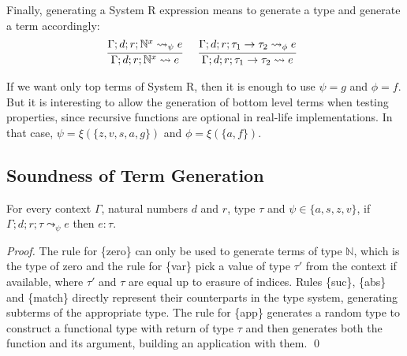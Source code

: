 \documentclass[runningheads]{llncs}
\newcommand{\tN}{\mathbb{N}}
\begin{document}
\noindent Finally, generating a System R expression means to generate a 
type and generate a term accordingly:
\[
\begin{array}{c c}
\infer[]{\Gamma; d; r; \tN^x \leadsto e}{\Gamma; d; r; \tN^x \leadsto_{\psi} e} &
\infer[]{\Gamma; d; r; \tau_1 \rightarrow \tau_2 \leadsto e}{\Gamma; d; r; \tau_1 \rightarrow \tau_2 \leadsto_{\phi} e}

\end{array}
\]

\noindent If we want only top terms of System R, then it is enough to 
use $\psi = g$ and $\phi = f$. But it is interesting to allow 
the generation of bottom level terms when testing properties, 
since recursive functions are optional in real-life 
implementations. In that case, $\psi = \xi(\{z, v, s, a, g\})$ and $\phi = \xi(\{a, f\})$.

\subsection{Soundness of Term Generation}

\begin{lemma}
  For every context $\Gamma$, natural numbers $d$ and $r$, type $\tau$ and ${\psi \in \{a, s, z, v\}}$, if ${\Gamma; d; r; \tau \leadsto_\psi e}$ then $e : \tau$. 
\end{lemma}
\begin{proof}
  The rule for \{zero\} can only be used to generate terms of type $\tN$, which is the type of zero and the rule for \{var\} pick a value of type $\tau'$ from the context if available, where $\tau'$ and $\tau$ are equal up to erasure of indices. Rules \{suc\}, 
  \{abs\} and \{match\} directly represent their counterparts in the type system, generating subterms of the appropriate type. The rule for \{app\} generates a random type to construct a functional type with return of type $\tau$ and then generates both the function and its argument, building an application with them. \qed
\end{proof}
\end{document}
